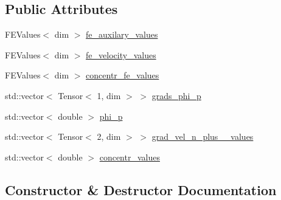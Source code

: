\subsection*{Public Attributes}
\begin{DoxyCompactItemize}
\item 
F\+E\+Values$<$ dim $>$ \hyperlink{struct_assembly_1_1_scratch_1_1relaxation__div__velocity__step_a3ee5d28e551b9672965d42c6a6f7e8ac}{fe\+\_\+auxilary\+\_\+values}
\item 
F\+E\+Values$<$ dim $>$ \hyperlink{struct_assembly_1_1_scratch_1_1relaxation__div__velocity__step_aff257091b62794122cf0a9f5ac2faafe}{fe\+\_\+velocity\+\_\+values}
\item 
F\+E\+Values$<$ dim $>$ \hyperlink{struct_assembly_1_1_scratch_1_1relaxation__div__velocity__step_a8c8792bcf1173a82f73e22ef1ef0dc02}{concentr\+\_\+fe\+\_\+values}
\item 
std\+::vector$<$ Tensor$<$ 1, dim $>$ $>$ \hyperlink{struct_assembly_1_1_scratch_1_1relaxation__div__velocity__step_a9fae0fc0a91b6c248c1f19bc7907a8cd}{grads\+\_\+phi\+\_\+p}
\item 
std\+::vector$<$ double $>$ \hyperlink{struct_assembly_1_1_scratch_1_1relaxation__div__velocity__step_a62319566acffdbef4ff0b505bae37b01}{phi\+\_\+p}
\item 
std\+::vector$<$ Tensor$<$ 2, dim $>$ $>$ \hyperlink{struct_assembly_1_1_scratch_1_1relaxation__div__velocity__step_a8eb65ba7135f100ceadb24a86d5d32ae}{grad\+\_\+vel\+\_\+n\+\_\+plus\+\_\+\_\+values}
\item 
std\+::vector$<$ double $>$ \hyperlink{struct_assembly_1_1_scratch_1_1relaxation__div__velocity__step_ae1f4407f45f1f05b5d69062f74f95425}{concentr\+\_\+values}
\end{DoxyCompactItemize}


\subsection{Constructor \& Destructor Documentation}
\hypertarget{struct_assembly_1_1_scratch_1_1relaxation__div__velocity__step_ac3a5853ca83d9a9c1b5f9a14792369eb}{}
